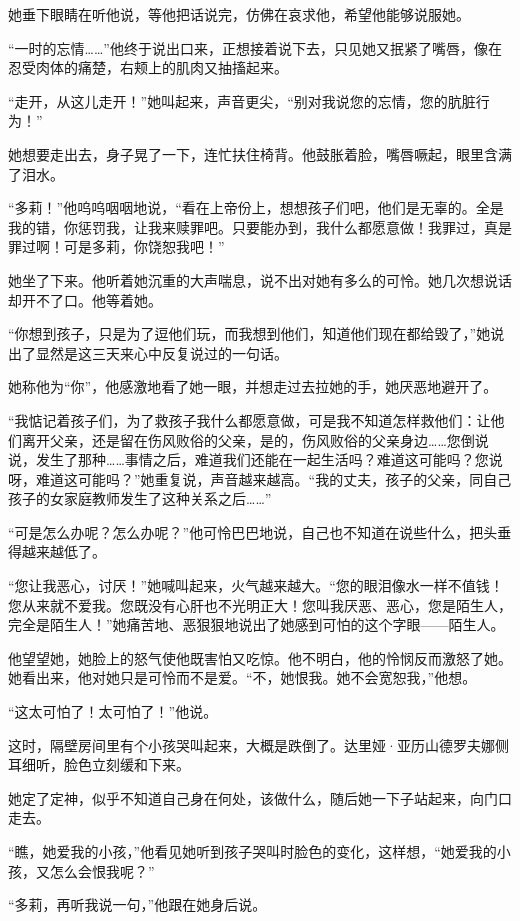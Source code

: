 \par 她垂下眼睛在听他说，等他把话说完，仿佛在哀求他，希望他能够说服她。
\par “一时的忘情……”他终于说出口来，正想接着说下去，只见她又抿紧了嘴唇，像在忍受肉体的痛楚，右颊上的肌肉又抽搐起来。
\par “走开，从这儿走开！”她叫起来，声音更尖，“别对我说您的忘情，您的肮脏行为！”
\par 她想要走出去，身子晃了一下，连忙扶住椅背。他鼓胀着脸，嘴唇噘起，眼里含满了泪水。
\par “多莉！”他呜呜咽咽地说，“看在上帝份上，想想孩子们吧，他们是无辜的。全是我的错，你惩罚我，让我来赎罪吧。只要能办到，我什么都愿意做！我罪过，真是罪过啊！可是多莉，你饶恕我吧！”
\par 她坐了下来。他听着她沉重的大声喘息，说不出对她有多么的可怜。她几次想说话却开不了口。他等着她。
\par “你想到孩子，只是为了逗他们玩，而我想到他们，知道他们现在都给毁了，”她说出了显然是这三天来心中反复说过的一句话。
\par 她称他为“你”，他感激地看了她一眼，并想走过去拉她的手，她厌恶地避开了。
\par “我惦记着孩子们，为了救孩子我什么都愿意做，可是我不知道怎样救他们：让他们离开父亲，还是留在伤风败俗的父亲，是的，伤风败俗的父亲身边……您倒说说，发生了那种……事情之后，难道我们还能在一起生活吗？难道这可能吗？您说呀，难道这可能吗？”她重复说，声音越来越高。“我的丈夫，孩子的父亲，同自己孩子的女家庭教师发生了这种关系之后……”
\par “可是怎么办呢？怎么办呢？”他可怜巴巴地说，自己也不知道在说些什么，把头垂得越来越低了。
\par “您让我恶心，讨厌！”她喊叫起来，火气越来越大。“您的眼泪像水一样不值钱！您从来就不爱我。您既没有心肝也不光明正大！您叫我厌恶、恶心，您是陌生人，完全是陌生人！”她痛苦地、恶狠狠地说出了她感到可怕的这个字眼——陌生人。
\par 他望望她，她脸上的怒气使他既害怕又吃惊。他不明白，他的怜悯反而激怒了她。她看出来，他对她只是可怜而不是爱。“不，她恨我。她不会宽恕我，”他想。
\par “这太可怕了！太可怕了！”他说。
\par 这时，隔壁房间里有个小孩哭叫起来，大概是跌倒了。达里娅·亚历山德罗夫娜侧耳细听，脸色立刻缓和下来。
\par 她定了定神，似乎不知道自己身在何处，该做什么，随后她一下子站起来，向门口走去。
\par “瞧，她爱我的小孩，”他看见她听到孩子哭叫时脸色的变化，这样想，“她爱我的小孩，又怎么会恨我呢？”
\par “多莉，再听我说一句，”他跟在她身后说。
